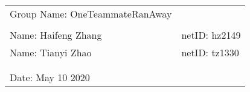 \documentclass[a4paper,12pt]{article}
\begin{document}
\begin{spacing}{1.3}%
\vspace*{0.25cm}

\hrulefill

\thispagestyle{empty}

\begin{center}
\begin{large}
\end{large}

\hrulefill

\vspace*{2cm}

\begin{large}
\end{large}
\vspace*{2cm}

\begin{large}
\end{large}

\end{center}

\vfill

\begin{table}[h!]
\begin{center}
\begin{tabular}{ll}
	Group Name:  OneTeammateRanAway\hspace*{2em} & \\
	&\\
	
	Name: Haifeng Zhang \hspace*{2em}&
	netID: hz2149\\
	
Name: Tianyi Zhao \hspace*{2em}&
netID: tz1330\\

 \hspace*{2em} \\
 \\

Date: May 10 2020


\end{tabular}
\end{center}
\end{table}


\end{spacing}
\end{document}
